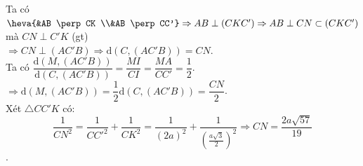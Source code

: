 \begin{ex}
{\begin{itemchoice}
		Ta có 
		$\heva{&AB \perp CK \\&AB \perp CC'} \Rightarrow AB \perp (CKC') \Rightarrow AB \perp CN \subset (CKC')$  mà $CN \perp C'K$ (gt)\\
		$\Rightarrow CN \perp  (AC'B) \Rightarrow \mathrm{d}\left(C,(AC'B)\right)=CN$.\\
		Ta có $\dfrac{\mathrm{d}\left(M,(AC'B)\right)}{\mathrm{d}\left(C,(AC'B)\right)}=\dfrac{MI}{CI}=\dfrac{MA}{CC'}=\dfrac{1}{2}$.  \\
		 $\Rightarrow \mathrm{d}\left(M,(AC'B)\right)=\dfrac{1}{2} \mathrm{d}\left(C,(AC'B)\right)=\dfrac{CN}{2}$.\\
		Xét $\triangle CC'K$ có: \[\dfrac{1}{CN^2}=\dfrac{1}{CC'^2}+\dfrac{1}{CK^2}=\dfrac{1}{(2a)^2}+\dfrac{1}{\left(\frac{a\sqrt{3}}{2}\right)^2}\Rightarrow  CN=\dfrac{2a\sqrt{57}}{19}\].
	\end{itemchoice}
 }
\end{ex}

